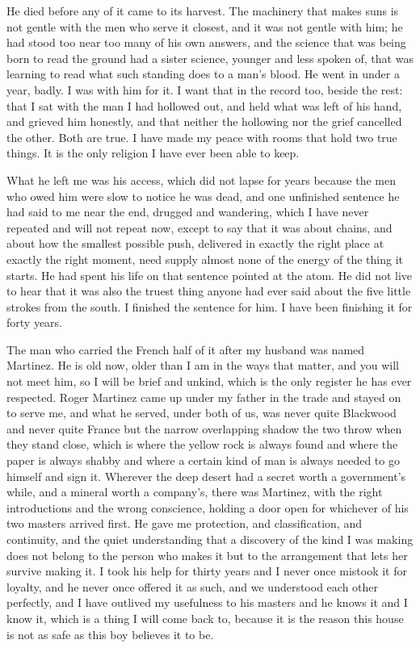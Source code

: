 He died before any of it came to its harvest. The machinery that makes suns is not gentle with the men who serve it closest, and it was not gentle with him; he had stood too near too many of his own answers, and the science that was being born to read the ground had a sister science, younger and less spoken of, that was learning to read what such standing does to a man's blood. He went in under a year, badly. I was with him for it. I want that in the record too, beside the rest: that I sat with the man I had hollowed out, and held what was left of his hand, and grieved him honestly, and that neither the hollowing nor the grief cancelled the other. Both are true. I have made my peace with rooms that hold two true things. It is the only religion I have ever been able to keep.\par

What he left me was his access, which did not lapse for years because the men who owed him were slow to notice he was dead, and one unfinished sentence he had said to me near the end, drugged and wandering, which I have never repeated and will not repeat now, except to say that it was about chains, and about how the smallest possible push, delivered in exactly the right place at exactly the right moment, need supply almost none of the energy of the thing it starts. He had spent his life on that sentence pointed at the atom. He did not live to hear that it was also the truest thing anyone had ever said about the five little strokes from the south. I finished the sentence for him. I have been finishing it for forty years.\par

\ornament

The man who carried the French half of it after my husband was named Martinez. He is old now, older than I am in the ways that matter, and you will not meet him, so I will be brief and unkind, which is the only register he has ever respected. Roger Martinez came up under my father in the trade and stayed on to serve me, and what he served, under both of us, was never quite Blackwood and never quite France but the narrow overlapping shadow the two throw when they stand close, which is where the yellow rock is always found and where the paper is always shabby and where a certain kind of man is always needed to go himself and sign it. Wherever the deep desert had a secret worth a government's while, and a mineral worth a company's, there was Martinez, with the right introductions and the wrong conscience, holding a door open for whichever of his two masters arrived first. He gave me protection, and classification, and continuity, and the quiet understanding that a discovery of the kind I was making does not belong to the person who makes it but to the arrangement that lets her survive making it. I took his help for thirty years and I never once mistook it for loyalty, and he never once offered it as such, and we understood each other perfectly, and I have outlived my usefulness to his masters and he knows it and I know it, which is a thing I will come back to, because it is the reason this house is not as safe as this boy believes it to be.\par

